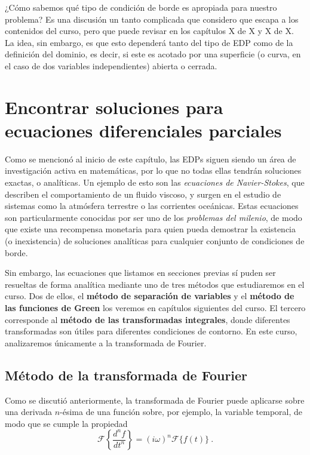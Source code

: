 ¿Cómo sabemos qué tipo de condición de borde es apropiada para nuestro problema? Es una discusión un tanto complicada que considero que escapa a los contenidos del curso, pero que puede revisar en los capítulos X de X y X de X. La idea, sin embargo, es que esto dependerá tanto del tipo de EDP como de la definición del dominio, es decir, si este es acotado por una superficie (o curva, en el caso de dos variables independientes) abierta o cerrada.

\section{Encontrar soluciones para ecuaciones diferenciales parciales}

Como se mencionó al inicio de este capítulo, las EDPs siguen siendo un área de investigación activa en matemáticas, por lo que no todas ellas tendrán soluciones exactas, o analíticas. Un ejemplo de esto son las \emph{ecuaciones de Navier-Stokes}, que describen el comportamiento de un fluido viscoso, y surgen en el estudio de sistemas como la atmósfera terrestre o las corrientes oceánicas. Estas ecuaciones son particularmente conocidas por ser uno de los \emph{problemas del milenio}, de modo que existe una recompensa monetaria para quien pueda demostrar la existencia (o inexistencia) de soluciones analíticas para cualquier conjunto de condiciones de borde.

Sin embargo, las ecuaciones que listamos en secciones previas sí puden ser resueltas de forma analítica mediante uno de tres métodos que estudiaremos en el curso. Dos de ellos, el \textbf{método de separación de variables} y el \textbf{método de las funciones de Green} los veremos en capítulos siguientes del curso. El tercero corresponde al \textbf{método de las transformadas integrales}, donde diferentes transformadas son útiles para diferentes condiciones de contorno. En este curso, analizaremos únicamente a la transformada de Fourier.

\subsection{Método de la transformada de Fourier}

Como se discutió anteriormente, la transformada de Fourier puede aplicarse sobre una derivada $n$-ésima de una función sobre, por ejemplo, la variable temporal, de modo que se cumple la propiedad
\begin{equation}
\mathcal{F}\left\{ \frac{d^n f}{dt^n} \right\} = (i\omega)^n \mathcal{F}\{f(t)\} \ .
\end{equation}

